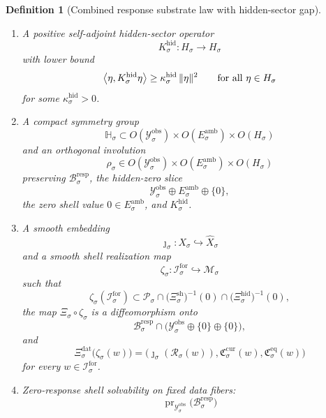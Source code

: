 \documentclass[11pt]{article}
\newcommand{\ForSpace}[1]{\mathcal I_{#1}^{\mathrm{for}}}
\newcommand{\Reduction}[1]{\mathcal R_{#1}}
\newcommand{\CurrentCarrier}[1]{\mathfrak C_{#1}^{\mathrm{cur}}}
\newcommand{\EqCarrier}[1]{\mathfrak C_{#1}^{\mathrm{eq}}}
\newcommand{\VisibleAffine}[1]{\widehat X_{#1}}
\newcommand{\DataSpace}[1]{\mathcal Y_{#1}^{\mathrm{obs}}}
\newcommand{\AmbientTarget}[1]{E_{#1}^{\mathrm{amb}}}
\newcommand{\ProtoSpace}[1]{\mathcal M_{#1}}
\newcommand{\ProtoBody}[1]{\mathcal P_{#1}}
\newcommand{\ResponseMap}[1]{\Xi_{#1}}
\newcommand{\ResponseData}[1]{\Xi_{#1}^{\mathrm{dat}}}
\newcommand{\ResponseShell}[1]{\Xi_{#1}^{\mathrm{sh}}}
\newcommand{\ResponseHidden}[1]{\Xi_{#1}^{\mathrm{hid}}}
\newcommand{\ResponseImage}[1]{\mathcal B_{#1}^{\mathrm{resp}}}
\newcommand{\GapSpace}[1]{H_{#1}}
\newcommand{\GapBody}[1]{D_{#1}}
\newcommand{\HiddenOperator}[1]{K_{#1}^{\mathrm{hid}}}
\newcommand{\ResponseSym}[1]{\mathbb H_{#1}}
\newcommand{\ResponseTime}[1]{\rho_{#1}}
\newcommand{\ProtoEmbed}[1]{\zeta_{#1}}
\newtheorem{definition}{Definition}
\begin{document}
\begin{definition}[Combined response substrate law with hidden-sector gap]
\begin{enumerate}
\begin{equation}
    (u,e,0)\in\ResponseImage{\sigma},
    \quad
    n\in\GapBody{\sigma}
    \right\}.
    \label{eq:responsefactor}
    \end{equation}
    \item A positive self-adjoint hidden-sector operator
    \[
    \HiddenOperator{\sigma}:\GapSpace{\sigma}\to\GapSpace{\sigma}
    \]
    with lower bound
    \begin{equation}
    \ev{\eta,\HiddenOperator{\sigma}\eta}
    \ge
    \kappa_{\sigma}^{\mathrm{hid}}\,
    \|\eta\|^{2}
    \qquad
    \text{for all }\eta\in\GapSpace{\sigma}
    \label{eq:combinedgap}
    \end{equation}
    for some \(\kappa_{\sigma}^{\mathrm{hid}}>0\).
    \item A compact symmetry group
    \[
    \ResponseSym{\sigma}\subset
    O(\DataSpace{\sigma})\times O(\AmbientTarget{\sigma})\times O(\GapSpace{\sigma})
    \]
    and an orthogonal involution
    \[
    \ResponseTime{\sigma}\in
    O(\DataSpace{\sigma})\times O(\AmbientTarget{\sigma})\times O(\GapSpace{\sigma})
    \]
    preserving \(\ResponseImage{\sigma}\), the hidden-zero slice
    \[
    \DataSpace{\sigma}\oplus \AmbientTarget{\sigma}\oplus\{0\},
    \]
    the zero shell value \(0\in \AmbientTarget{\sigma}\), and \(\HiddenOperator{\sigma}\).
    \item A smooth embedding
    \[
    \jmath_{\sigma}:X_{\sigma}\hookrightarrow \VisibleAffine{\sigma}
    \]
    and a smooth shell realization map
    \[
    \ProtoEmbed{\sigma}:\ForSpace{\sigma}\hookrightarrow \ProtoSpace{\sigma}
    \]
    such that
    \[
    \ProtoEmbed{\sigma}(\ForSpace{\sigma})
    \subset
    \ProtoBody{\sigma}\cap
    \bigl(\ResponseShell{\sigma}\bigr)^{-1}(0)\cap
    \bigl(\ResponseHidden{\sigma}\bigr)^{-1}(0),
    \]
    the map \(\ResponseMap{\sigma}\circ\ProtoEmbed{\sigma}\) is a diffeomorphism onto
    \[
    \ResponseImage{\sigma}\cap
    \bigl(
    \DataSpace{\sigma}\oplus\{0\}\oplus\{0\}
    \bigr),
    \]
    and
    \begin{equation}
    \ResponseData{\sigma}\bigl(\ProtoEmbed{\sigma}(w)\bigr)
    =
    \bigl(
    \jmath_{\sigma}(\Reduction{\sigma}(w)),
    \CurrentCarrier{\sigma}(w),
    \EqCarrier{\sigma}(w)
    \bigr)
    \label{eq:combinedcompat}
    \end{equation}
    for every \(w\in\ForSpace{\sigma}\).
    \item Zero-response shell solvability on fixed data fibers:
    \begin{equation}
    \operatorname{pr}_{\DataSpace{\sigma}}\bigl(\ResponseImage{\sigma}\bigr)

\end{equation}
\end{enumerate}
\end{definition}
\end{document}

